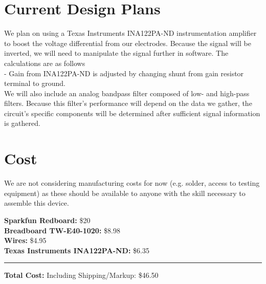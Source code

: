 \documentclass[11pt, oneside]{article}   	%
\begin{document}
\section{Current Design Plans}
We plan on using a Texas Instruments INA122PA-ND instrumentation amplifier to boost the voltage differential from our electrodes. \cite{INA122PA-ND} Because the signal will be inverted, we will need to manipulate the signal further in software. The calculations are as follows\\
\noindent - Gain from INA122PA-ND is adjusted by changing shunt from gain resistor terminal to ground.\\
We will also include an analog bandpass filter composed of low- and high-pass filters. Because this filter's performance will depend on the data we gather, the circuit's specific components will be determined after sufficient signal information is gathered.

\section{Cost}
We are not considering manufacturing costs for now (e.g. solder, access to testing equipment) as these should be available to anyone with the skill necessary to assemble this device.

\noindent \textbf{Sparkfun Redboard:} \hfill \$20\\
\textbf{Breadboard TW-E40-1020:} \hfill \$8.98\\
\textbf{Wires:} \hfill \$4.95\\
\textbf{Texas Instruments INA122PA-ND:}  \hfill \$6.35\\
\rule{\textwidth}{1pt}
\textbf{Total Cost:} \hfill Including Shipping/Markup: \$46.50\\
\pagebreak
\end{document}

